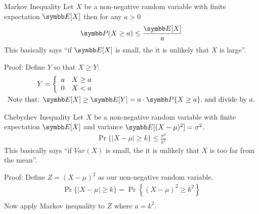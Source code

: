 \documentclass[aspectratio=169,11pt]{beamer}
\begin{document}
\begin{frame}{Markov Inequality}
Let $X$ be a \alert{non-negative} random variable with finite expectation $\E[X]$ then for any $a >0$ 
\begin{align*}
\Pr(X \geq a) \leq \frac{\E[X]}{a}
\end{align*}
This basically says ``if $\E[X]$ is small, the it is unlikely that $X$ is large''.\\ \vspace{0.25cm}
\pause

Proof: Define $Y$ so that $X \geq Y$:
\begin{align*}
Y&=\left\{\begin{array}{ll}a & X \geq a \\ 0 & X<a\end{array}\right.\\
\text{Note that: }& \E[X] \geq \E[Y] = a \cdot \Pr{}\{X \geq a\}. \text{ and divide by } a.
\end{align*}
\end{frame}

\begin{frame}{Chebyshev Inequality}
Let $X$ be a \alert{non-negative} random variable with finite expectation $\E[X]$ \alert{and variance} $\E[(X-\mu)^2]=\sigma^2$.
\begin{align*}
\Pr\{|X-\mu| \geq k\} \leq \frac{\sigma^2}{k^2}
\end{align*}
This basically says ``if $Var(X)$ is small, the it is unlikely that $X$ is too far from the mean''.\\ \vspace{0.25cm}
\pause

Proof: Define $Z=(X-\mu)^2$ as our non-negative random variable.
\begin{align*}
\Pr\{|X-\mu| \geq k\}=\Pr\left\{(X-\mu)^2 \geq k^2\right\}\\ 
\end{align*}
Now apply Markov inequality to $Z$ where $a=k^2$.
\end{frame}
\end{document}
